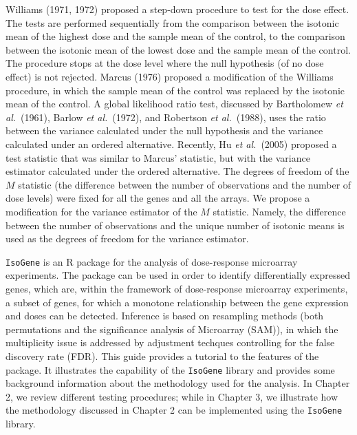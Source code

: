 Williams (1971, 1972) proposed a step-down procedure to test for the
dose effect. The tests are performed sequentially from the
comparison between the isotonic mean of the highest dose and the
sample mean of the control, to the comparison between the isotonic
mean of the lowest dose and the sample mean of the control. The
procedure stops at the dose level where the null hypothesis (of no
dose effect) is not rejected. Marcus (1976) proposed a modification
of the Williams procedure, in which the sample mean of the control
was replaced by the isotonic mean of the control. A global
likelihood ratio test, discussed by Bartholomew \textit{et al.}\
(1961), Barlow \textit{et al.}\ (1972), and Robertson \textit{et
al.}\ (1988), uses the ratio between the variance calculated under
the null hypothesis and the variance calculated under an ordered
alternative. Recently, Hu \textit{et al.}\ (2005) proposed a test
statistic that was similar to Marcus' statistic, but with the
variance estimator calculated under the ordered alternative. The
degrees of freedom of the $M$ statistic (the difference between the
number of observations and the number of dose levels) were fixed for
all the genes and all the arrays. We propose a modification for the
variance estimator of the $M$ statistic. Namely, the difference
between the number of observations and the unique number of isotonic
means is used as the degrees of freedom for the variance estimator.

\texttt{IsoGene} is an R package for the analysis of dose-response microarray experiments. The package can be used in order to identify differentially expressed genes, which are, within the framework of dose-response microarray experiments, a subset of genes, for which a monotone relationship between the gene expression and doses can be detected. Inference is based on resampling methods (both permutations and the significance analysis of Microarray (SAM)), in which the multiplicity issue is addressed by adjustment techques controlling for the false discovery rate (FDR). This guide provides a tutorial to the features of the package. It illustrates the capability of the \texttt{IsoGene} library and provides some background information about the methodology used for the analysis. In Chapter 2, we review different testing procedures; while in Chapter 3, we illustrate how the methodology discussed in Chapter 2 can be implemented using the \texttt{IsoGene} library.


